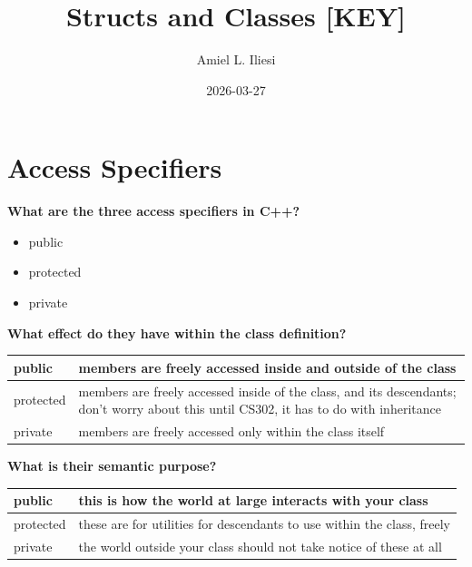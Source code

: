 \documentclass[12pt, letterpaper]{article}
\title{Structs and Classes \color{red}\textbf{[KEY]}}
\author{Amiel L. Iliesi}
\date{2026-03-27}
\newcommand{\question}[1]{\textbf{#1}\par}
\newenvironment{answerblock}{\color{Green4}}{\normalcolor\vspace{1em}}
\begin{document}
\maketitle

\tableofcontents

\pagebreak
\section{Access Specifiers}

\question{What are the three access specifiers in C++?}
\begin{answerblock}
\begin{itemize}
    \item public
    \item protected
    \item private
\end{itemize}
\end{answerblock}

\question{What effect do they have within the class definition?}
\begin{answerblock}
\begin{tabular}{| l | p{} |}
    \hline
    public & members are freely accessed inside and outside of the class \\
    \hline
    protected & members are freely accessed inside of the class, and its
    descendants; don't worry about this until CS302, it has to do with inheritance \\
    \hline
    private & members are freely accessed only within the class itself \\
    \hline
\end{tabular}
\end{answerblock}

\question{What is their semantic purpose?}
\begin{answerblock}
\begin{tabular}{| l | p{} |}
    \hline
    public & this is how the world at large interacts with your class \\
    \hline
    protected & these are for utilities for descendants to use within the
    class, freely \\
    \hline
    private & the world outside your class should not take notice of these at
    all \\
    \hline
\end{tabular}
\end{answerblock}
\end{document}
